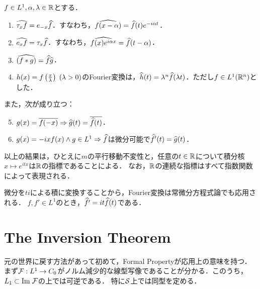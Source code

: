 \documentclass[uplatex,dvipdfmx]{jsreport}
\begin{document}
\begin{theorem}[Fourier変換の関手性]
    $f\in L^1,\al,\lambda\in\R$とする．
    \begin{enumerate}
        \item $\wh{\tau_xf}=e_{-x}\wh{f}$．すなわち，$\wh{f(x-\al)}=\wh{f}(t)e^{-i\al t}$．
        \item $\wh{e_xf}=\tau_x\wh{f}$．すなわち，$\wh{f(x)e^{i\al x}}=\wh{f}(t-\al)$．
        \item $\wh{(f*g)}=\wh{f}\wh{g}$．
        \item $h(x)=f\paren{\frac{x}{\lambda}}\;(\lambda>0)$のFourier変換は，$\wh{h}(t)=\lambda^n\wh{f}(\lambda t)$．ただし$f\in L^1(\R^n)$とした．
    \end{enumerate}
    また，次が成り立つ：
    \begin{enumerate}\setcounter{enumi}{4}
        \item $g(x)=\o{f(-x)}\Rightarrow\wh{g}(t)=\o{\wh{f}(t)}$．
        \item $g(x)=-ixf(x)\land g\in L^1\Rightarrow\wh{f}$は微分可能で$\wh{f}'(t)=\wh{g}(t)$．
    \end{enumerate}
\end{theorem}
\begin{remarks}
    以上の結果は，ひとえに$m$の平行移動不変性と，任意の$t\in\R$について積分核$x\mapsto e^{itx}$は$\R$の指標であることによる．
    なお，$\R$の連続な指標はすべて指数関数によって表現される．
\end{remarks}

\begin{remark}[(6)の逆]
    微分を$ti$による積に変換することから，Fourier変換は常微分方程式論でも応用される．
    $f,f'\in L^1$のとき，$\wh{f'}=it\wh{f}(t)$である．
\end{remark}

\section{The Inversion Theorem}

\begin{tcolorbox}[colframe=ForestGreen, colback=ForestGreen!10!white,breakable,colbacktitle=ForestGreen!40!white,coltitle=black,fonttitle=\bfseries\sffamily,
title=]
    元の世界に戻す方法があって初めて，Formal Propertyが応用上の意味を持つ．
    まず$\F:L^1\to C_0$がノルム減少的な線型写像であることが分かる．このうち，$L_1\subset\Im\F$の上では可逆である．
    特に$\S$上では同型を定める．
\end{tcolorbox}
\end{document}
